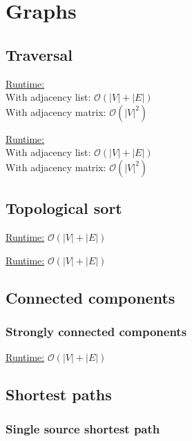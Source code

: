 \section{Graphs}
\subsection{Traversal}

\underline{Runtime:}\\
With adjacency list: $\mathcal{O}(\lvert V \rvert + \lvert E \rvert)$ \\
With adjacency matrix: $\mathcal{O}(\lvert V \rvert^2)$

\underline{Runtime:}\\
With adjacency list: $\mathcal{O}(\lvert V \rvert + \lvert E \rvert)$ \\
With adjacency matrix: $\mathcal{O}(\lvert V \rvert^2)$


\subsection{Topological sort}

\underline{Runtime:} $\mathcal{O}(\lvert V \rvert + \lvert E \rvert)$

\underline{Runtime:} $\mathcal{O}(\lvert V \rvert + \lvert E \rvert)$


\subsection{Connected components}

\subsubsection{Strongly connected components}
\underline{Runtime:} $\mathcal{O}(\lvert V \rvert + \lvert E \rvert)$



\subsection{Shortest paths}

\subsubsection{Single source shortest path}



